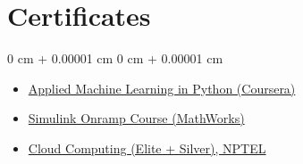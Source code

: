 \documentclass[10pt, letterpaper]{article}
\newenvironment{highlightsforbulletentries}{
    \begin{itemize}[
        topsep=0.10 cm,
        parsep=0.10 cm,
        partopsep=0pt,
        itemsep=0pt,
        leftmargin=10pt
    ]
}{
    \end{itemize}
} %
\newenvironment{onecolentry}{
    \begin{adjustwidth}{
        0 cm + 0.00001 cm
    }{
        0 cm + 0.00001 cm
    }
}{
    \end{adjustwidth}
} %
\begin{document}
    \section{Certificates}
    \begin{onecolentry}
        \begin{highlightsforbulletentries}
            \item \href{https://www.coursera.org/account/accomplishments/verify/LKAUB6KGR2SP?utm_source=link&utm_medium=certificate&utm_content=cert_image&utm_campaign=pdf_header_button&utm_product=course}{Applied Machine Learning in Python (Coursera)}
            \item \href{https://matlabacademy.mathworks.com/progress/certificate.pdf?course=simulink&release=simulinkR2019a&language=en&}{Simulink Onramp Course (MathWorks)}
            \item \href{https://archive.nptel.ac.in/noc/B2C/candidate_login/candidate_scores.php?courseid=noc24-cs17}{Cloud Computing (Elite + Silver), NPTEL}
        \end{highlightsforbulletentries}
    \end{onecolentry}
\end{document}
